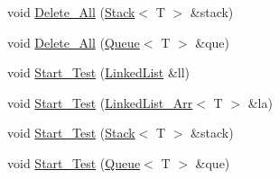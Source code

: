 \begin{DoxyCompactItemize}
\item 
void \hyperlink{class_l_ltester_aa669cffc9af3f0af3f7af2a42079b555}{Delete\-\_\-\-All} (\hyperlink{class_stack}{Stack}$<$ T $>$ \&stack)
\item 
void \hyperlink{class_l_ltester_a6b4b5fc311e0daabf2605493ee1c0d70}{Delete\-\_\-\-All} (\hyperlink{class_queue}{Queue}$<$ T $>$ \&que)
\item 
void \hyperlink{class_l_ltester_aa8fd00f85de53957afd4d1306af17fa0}{Start\-\_\-\-Test} (\hyperlink{class_linked_list}{Linked\-List} \&ll)
\item 
void \hyperlink{class_l_ltester_a85f069982d814a755412c83237d2dc38}{Start\-\_\-\-Test} (\hyperlink{class_linked_list___arr}{Linked\-List\-\_\-\-Arr}$<$ T $>$ \&la)
\item 
void \hyperlink{class_l_ltester_a8046a64f9635a09b6b74a86ad6840b9c}{Start\-\_\-\-Test} (\hyperlink{class_stack}{Stack}$<$ T $>$ \&stack)
\item 
void \hyperlink{class_l_ltester_a971c6ec6596cf580f74dd286abe75c8f}{Start\-\_\-\-Test} (\hyperlink{class_queue}{Queue}$<$ T $>$ \&que)
\end{DoxyCompactItemize}


